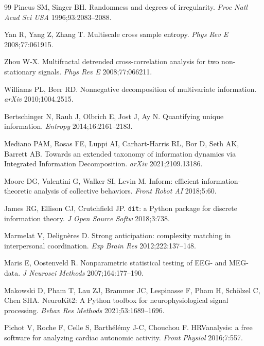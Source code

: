 \documentclass[11pt,a4paper]{article}
\begin{document}
\begin{thebibliography}{99}
Pincus SM, Singer BH.
Randomness and degrees of irregularity.
\emph{Proc Natl Acad Sci USA} 1996;93:2083--2088.

Yan R, Yang Z, Zhang T.
Multiscale cross sample entropy.
\emph{Phys Rev E} 2008;77:061915.

Zhou W-X.
Multifractal detrended cross-correlation analysis for two
non-stationary signals. \emph{Phys Rev E} 2008;77:066211.

Williams PL, Beer RD.
Nonnegative decomposition of multivariate information.
\emph{arXiv} 2010;1004.2515.

Bertschinger N, Rauh J, Olbrich E, Jost J, Ay N.
Quantifying unique information.
\emph{Entropy} 2014;16:2161--2183.

Mediano PAM, Rosas FE, Luppi AI, Carhart-Harris RL, Bor D, Seth AK,
Barrett AB.
Towards an extended taxonomy of information dynamics via Integrated
Information Decomposition. \emph{arXiv} 2021;2109.13186.

Moore DG, Valentini G, Walker SI, Levin M.
Inform: efficient information-theoretic analysis of collective
behaviors. \emph{Front Robot AI} 2018;5:60.

James RG, Ellison CJ, Crutchfield JP.
\texttt{dit}: a Python package for discrete information theory.
\emph{J Open Source Softw} 2018;3:738.

Marmelat V, Delign\`eres D.
Strong anticipation: complexity matching in interpersonal coordination.
\emph{Exp Brain Res} 2012;222:137--148.

Maris E, Oostenveld R.
Nonparametric statistical testing of EEG- and MEG-data.
\emph{J Neurosci Methods} 2007;164:177--190.

Makowski D, Pham T, Lau ZJ, Brammer JC, Lespinasse F, Pham H,
Sch\"olzel C, Chen SHA.
NeuroKit2: A Python toolbox for neurophysiological signal processing.
\emph{Behav Res Methods} 2021;53:1689--1696.

Pichot V, Roche F, Celle S, Barth\'el\'emy J-C, Chouchou F.
HRVanalysis: a free software for analyzing cardiac autonomic activity.
\emph{Front Physiol} 2016;7:557.

\end{thebibliography}
\end{document}
